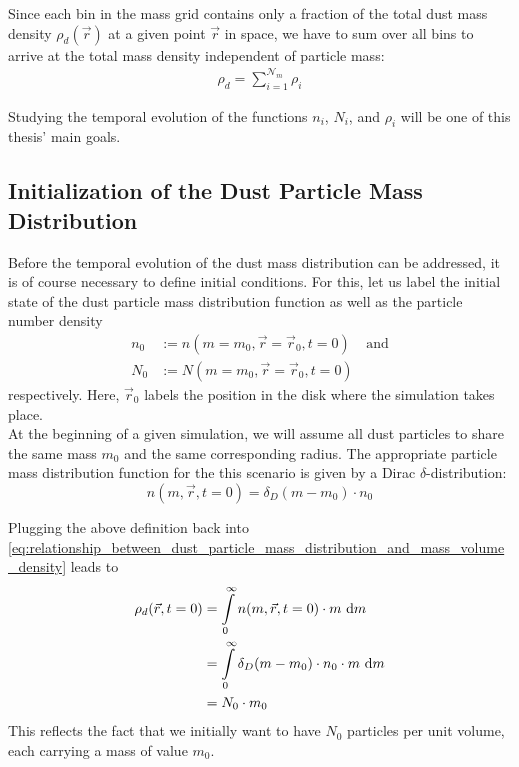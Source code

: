     Since each bin in the mass grid contains only a fraction of the total dust mass density
    $\rho_d(\vec r)$ at a given point $\vec r$ in space, we have to sum over all bins
    to arrive at the total mass density independent of particle mass:
    \begin{align}
        \label{eq:relationship_between_discretized_dust_particle_mass_distribution_and_mass_volume_density}
        \rho_d = \sum_{i=1}^{\mathcal N_m} \rho_i
    \end{align}

    Studying the temporal evolution of the functions $n_i$, $N_i$, and $\rho_i$ will be 
    one of this thesis' main goals.

\clearpage\subsection{Initialization of the Dust Particle Mass Distribution}

    Before the temporal evolution of the dust mass distribution can be addressed, it is of 
    course necessary to define initial conditions. For this, let us label the initial state 
    of the dust particle mass distribution function as well as the particle number density
    \begin{align}
        n_0 &:= n(m=m_0, \vec r=\vec r_0, t=0) 
        \ \ \ \ \ \text{and} \\
        N_0 &:= N(m=m_0, \vec r=\vec r_0, t=0)
    \end{align}
    respectively. Here, $\vec r_0$ labels the position in the disk where the simulation takes
    place. \\

    At the beginning of a given simulation, we will assume all dust particles to share the same 
    mass $m_0$ and the same corresponding radius.
    The appropriate particle mass distribution function for the this scenario is given by a 
    Dirac $\delta$-distribution:
    \begin{equation}
        \label{eq:dirac_delta_identity}
        n(m, \vec r, t=0) = \delta_D(m-m_0) \cdot n_0  
    \end{equation}

    Plugging the above definition back into
    \cref{eq:relationship_between_dust_particle_mass_distribution_and_mass_volume_density}
    leads to
    \begin{align}
        \rho_d(\vec r, t=0) 
            &= \int\limits_0^\infty n(m, \vec r, t=0) \cdot m\ \text dm \\
            &= \int\limits_0^\infty \delta_D(m-m_0) \cdot n_0 \cdot m\ \text dm \\
            &= N_0 \cdot m_0
    \end{align}
    This reflects the fact that we initially want to have $N_0$ particles per unit volume, each 
    carrying a mass of value $m_0$. \\

